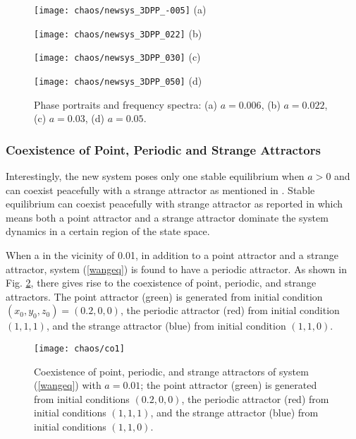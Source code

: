 \begin{figure}[h]\label{fig:one_equi_01}
\begin{minipage}[t]{0.45\textwidth}
\centering
\texttt{[image: chaos/newsys\_3DPP\_-005]}
{\small (a)}
\end{minipage}
\hfill
\begin{minipage}[t]{0.45\linewidth}
\centering
\texttt{[image: chaos/newsys\_3DPP\_022]}
{\small (b)}
\end{minipage}

\begin{minipage}[t]{0.45\linewidth}
\centering
\texttt{[image: chaos/newsys\_3DPP\_030]}
{\small (c)}
\end{minipage}
\hfill
\begin{minipage}[t]{0.45\linewidth}
\centering
\texttt{[image: chaos/newsys\_3DPP\_050]}
{\small (d)}
\end{minipage}
\caption{\label{bif2}Phase portraits and frequency spectra:
(a) $a=0.006$, (b) $a=0.022$, (c) $a=0.03$, (d) $a=0.05$.}
\end{figure}


\subsubsection{Coexistence of Point, Periodic and Strange Attractors}

Interestingly, the new system poses only one stable equilibrium when $a>0$ and can coexist peacefully
with a strange attractor as mentioned in \cite{Wang2012b}.
Stable equilibrium can coexist peacefully with strange attractor as reported in \cite{Wang2012b} which
means both a point attractor and a strange attractor dominate the system dynamics in a certain region of
the state space.

When a in the vicinity of 0.01, in addition to a point attractor and a strange attractor, system (\ref{wangeq})
is found to have a periodic attractor. As shown in Fig. \ref{f1}, there gives rise to the coexistence  of point, periodic,
and strange attractors. The point attractor (green) is generated from initial condition $ (x_{0}, y_{0}, z_{0}) = (0.2, 0, 0)$,
the periodic attractor (red) from initial condition $(1, 1, 1)$, and the strange attractor (blue) from initial condition $(1, 1, 0)$.

\begin{figure}
\centering
\texttt{[image: chaos/co1]}
\caption{Coexistence of point, periodic, and strange
attractors of system (\ref{wangeq}) with $a=0.01$; the point attractor
(green) is generated from initial conditions $(0.2, 0, 0)$, the periodic
attractor (red) from initial conditions $(1, 1, 1)$, and the strange
attractor (blue) from initial conditions $(1, 1, 0)$.} \label{f1}
\end{figure}

